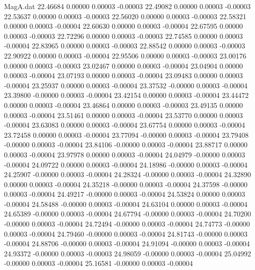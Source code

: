 \begin{filecontents}{MagA.dat}
  22.46684    0.00000    0.00003   -0.00003
  22.49082    0.00000    0.00003   -0.00003
  22.53637    0.00000    0.00003   -0.00003
  22.56020    0.00000    0.00003   -0.00003
  22.58321    0.00000    0.00003   -0.00004
  22.60630    0.00000    0.00003   -0.00004
  22.67595    0.00000    0.00003   -0.00003
  22.72296    0.00000    0.00003   -0.00003
  22.74585    0.00000    0.00003   -0.00004
  22.83965    0.00000    0.00003   -0.00003
  22.88542    0.00000    0.00003   -0.00003
  22.90922    0.00000    0.00003   -0.00004
  22.95506    0.00000    0.00003   -0.00003
  23.00176    0.00000    0.00003   -0.00003
  23.02467    0.00000    0.00003   -0.00004
  23.04904    0.00000    0.00003   -0.00004
  23.07193    0.00000    0.00003   -0.00004
  23.09483    0.00000    0.00003   -0.00004
  23.25937    0.00000    0.00003   -0.00004
  23.37532   -0.00000    0.00003   -0.00004
  23.39800   -0.00000    0.00003   -0.00004
  23.42154    0.00000    0.00003   -0.00004
  23.44472    0.00000    0.00003   -0.00004
  23.46864    0.00000    0.00003   -0.00003
  23.49135    0.00000    0.00003   -0.00004
  23.51461    0.00000    0.00003   -0.00004
  23.53770    0.00000    0.00003   -0.00004
  23.63083    0.00000    0.00003   -0.00004
  23.67754    0.00000    0.00003   -0.00004
  23.72458    0.00000    0.00003   -0.00004
  23.77094   -0.00000    0.00003   -0.00004
  23.79408   -0.00000    0.00003   -0.00004
  23.84106   -0.00000    0.00003   -0.00004
  23.88717    0.00000    0.00003   -0.00004
  23.97978    0.00000    0.00003   -0.00004
  24.04979   -0.00000    0.00003   -0.00004
  24.09722    0.00000    0.00003   -0.00004
  24.18986   -0.00000    0.00003   -0.00004
  24.25907   -0.00000    0.00003   -0.00004
  24.28324   -0.00000    0.00003   -0.00004
  24.32890    0.00000    0.00003   -0.00004
  24.35218   -0.00000    0.00003   -0.00004
  24.37598   -0.00000    0.00003   -0.00004
  24.49217   -0.00000    0.00003   -0.00004
  24.53824    0.00000    0.00003   -0.00004
  24.58488   -0.00000    0.00003   -0.00004
  24.63104    0.00000    0.00003   -0.00004
  24.65389   -0.00000    0.00003   -0.00004
  24.67794   -0.00000    0.00003   -0.00004
  24.70200   -0.00000    0.00003   -0.00004
  24.72494   -0.00000    0.00003   -0.00004
  24.74773   -0.00000    0.00003   -0.00004
  24.79460   -0.00000    0.00003   -0.00004
  24.81743   -0.00000    0.00003   -0.00004
  24.88706   -0.00000    0.00003   -0.00004
  24.91094   -0.00000    0.00003   -0.00004
  24.93372   -0.00000    0.00003   -0.00003
  24.98059   -0.00000    0.00003   -0.00004
  25.04992   -0.00000    0.00003   -0.00004
  25.16581   -0.00000    0.00003   -0.00004

\end{filecontents}
